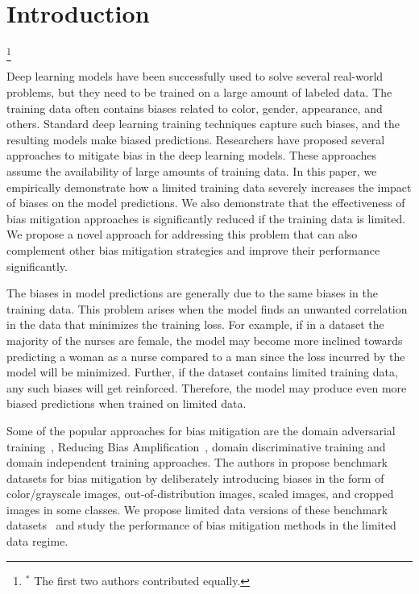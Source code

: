 \documentclass[10pt,twocolumn,letterpaper]{article}
\newcommand\blfootnote[1]{%
  \begingroup
  \renewcommand\thefootnote{}\footnote{#1}%
  \addtocounter{footnote}{-1}%
  \endgroup
}
\begin{document}
\section{Introduction} 
\blfootnote{$^\ast$ The first two authors contributed equally.}
Deep learning models have been successfully used to solve several real-world problems, but they need to be trained on a large amount of labeled data. The training data often contains biases related to color, gender, appearance, and others. Standard deep learning training techniques capture such biases, and the resulting models make biased predictions. Researchers have proposed several approaches to mitigate bias in the deep learning models. These approaches assume the availability of large amounts of training data. In this paper, we empirically demonstrate how a limited training data severely increases the impact of biases on the model predictions. We also demonstrate that the effectiveness of bias mitigation approaches is significantly reduced if the training data is limited. We propose a novel approach for addressing this problem that can also complement other bias mitigation strategies and improve their performance significantly.

The biases in model predictions are generally due to the same biases in the training data. This problem arises when the model finds an unwanted correlation in the data that minimizes the training loss. For example, if in a dataset the majority of the nurses are female, the model may become more inclined towards predicting a woman as a nurse compared to a man since the loss incurred by the model will be minimized. Further, if the dataset contains limited training data, any such biases will get reinforced. Therefore, the model may produce even more biased predictions when trained on limited data. 

Some of the popular approaches for bias mitigation are the domain adversarial training~\cite{tzeng2015simultaneous,ryu2017improving,alvi2018turning}, Reducing Bias Amplification~\cite{zhao_men_2017}, domain discriminative training \cite{wang2020towards} and domain independent training \cite{wang2020towards} approaches. The authors in \cite{wang2020towards} propose benchmark datasets for bias mitigation by deliberately introducing biases in the form of color/grayscale images, out-of-distribution images, scaled images, and cropped images in some classes. We propose limited data versions of these benchmark datasets~\cite{wang2020towards} and study the performance of bias mitigation methods in the limited data regime.
\end{document}
